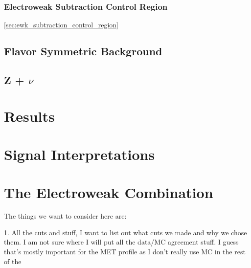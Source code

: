     \subsubsection{Electroweak Subtraction Control Region} \ref{sec:ewk_subtraction_control_region}

  \subsection{Flavor Symmetric Background} \label{sec:flavor_symmetric_background}

  \subsection{Z + $\nu$} \label{sec:z_+_neutrino}

\section{Results}

\section{Signal Interpretations} 

\section{The Electroweak Combination}

The things we want to consider here are: 

  1. All the cuts and stuff, I want to list out what cuts we made and why we chose them. I am not sure where I will put all the data/MC agreement stuff. I guess that's mostly important for the MET profile as I don't really use MC in the rest of the
